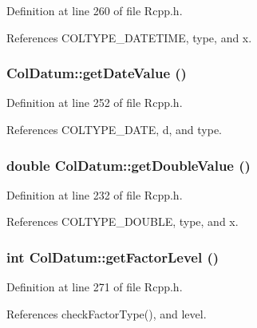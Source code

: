 Definition at line 260 of file Rcpp.h.

References COLTYPE\_\-DATETIME, type, and x.\hypertarget{classColDatum_70480f53f9cee46bcdaed7331e38c943}{
\subsubsection[{getDateValue}]{ ColDatum::getDateValue ()}}
\label{classColDatum_70480f53f9cee46bcdaed7331e38c943}




Definition at line 252 of file Rcpp.h.

References COLTYPE\_\-DATE, d, and type.\hypertarget{classColDatum_6a19044be8ade2b14b372b179210a9bd}{
\subsubsection[{getDoubleValue}]{\setlength{\rightskip}{0pt plus 5cm}double ColDatum::getDoubleValue ()}}
\label{classColDatum_6a19044be8ade2b14b372b179210a9bd}




Definition at line 232 of file Rcpp.h.

References COLTYPE\_\-DOUBLE, type, and x.\hypertarget{classColDatum_df3716db9f3483f3cd255a4c05823479}{
\subsubsection[{getFactorLevel}]{\setlength{\rightskip}{0pt plus 5cm}int ColDatum::getFactorLevel ()}}
\label{classColDatum_df3716db9f3483f3cd255a4c05823479}




Definition at line 271 of file Rcpp.h.

References checkFactorType(), and level.

